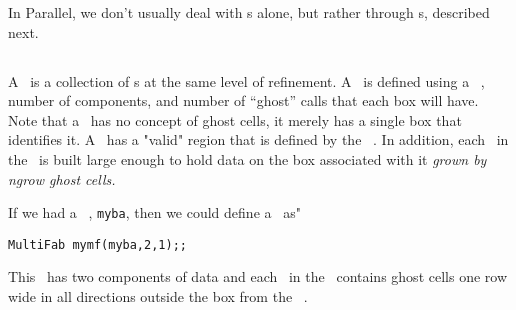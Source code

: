 In Parallel, we don't usually deal with \FAB s alone, but rather
through \MultiFab s, described next.

\subsection{\MultiFab}

A \MultiFab\ is a collection of \FAB s at the same level of
refinement.  A \MultiFab\ is defined using a \BoxArray\ ,
number of components, and number of ``ghost'' calls that each box
will have.  Note that a \FAB\ has no concept of ghost cells, it
merely has a single box that identifies it.  A \MultiFab\ has
a "valid" region that is defined by the \BoxArray\ .  In addition,
each \FAB\ in the \MultiFab\ is built large enough to hold data
on the box associated with it {\it grown by ngrow ghost cells.}

If we had a \BoxArray\ , {\tt myba}, then we could define a \MultiFab\
as"

\begin{verbatim}
MultiFab mymf(myba,2,1);;
\end{verbatim}

This \MultiFab\ has two components of data and each \FAB\ in the \MultiFab\
contains ghost cells one row wide in all directions outside the box from the \BoxArray\ .

